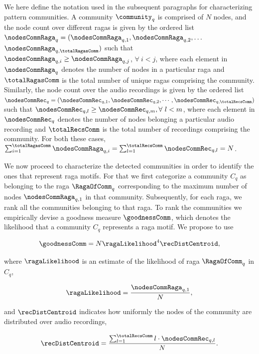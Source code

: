 {We here define the notation used in the subsequent paragraphs for characterizing pattern communities. A community $\community_q$ is comprised of $N$ nodes, and the node count over different \glspl{raga} is given by the ordered list ${{\nodesCommRaga}_q} = (\nodesCommRaga_{q,1}, \nodesCommRaga_{q,2},\dots$ $\nodesCommRaga_{q,\totalRagasComm})$ such that $\nodesCommRaga_{q,i} \geq \nodesCommRaga_{q,j}$, $\forall~ i < j$,
where each element in $\nodesCommRaga_{q}$ denotes the number of nodes in a particular \gls{raga} and $\totalRagasComm$ is the total number of unique \glspl{raga} comprising the community. Similarly, the node count over the audio recordings is given by the ordered list ${{\nodesCommRec}_q} = (\nodesCommRec_{q,1}, \nodesCommRec_{q,2},\cdots,\nodesCommRec_{q,\totalRecsComm})$ such that $\nodesCommRec_{q,l} \geq \nodesCommRec_{q,m}, \forall~l < m$, where each element in $\nodesCommRec_{q}$ denotes the number of nodes belonging a particular audio recording and $\totalRecsComm$ is the total number of recordings comprising the community. For both these cases, $\sum_{i=1}^{\totalRagasComm}\nodesCommRaga_{q,i} = \sum_{l=1}^{\totalRecsComm}\nodesCommRec_{q,l} = N$.

We now proceed to characterize the detected communities in order to identify the ones that represent \gls{raga} motifs. For that we first categorize a community $C_q$ as belonging to the \gls{raga} $\RagaOfComm_q$ corresponding to the maximum number of nodes $\nodesCommRaga_{q,1}$ in that community. Subsequently, for each \gls{raga}, we rank all the communities belonging to that \gls{raga}. To rank the communities we empirically devise a goodness measure $\goodnessComm$, which denotes the likelihood that a community $C_q$ represents a \gls{raga} motif. We propose to use

\begin{equation}
\goodnessComm = N \ragaLikelihood^4 \recDistCentroid,
\label{eq:gamma_pattern_characterization}
\end{equation}

where $\ragaLikelihood$ is an estimate of the likelihood of \gls{raga} $\RagaOfComm_q$ in $C_q$, 

\begin{equation}
\ragaLikelihood = \frac{\nodesCommRaga_{q,1}}{N},
\end{equation}

and $\recDistCentroid$ indicates how uniformly the nodes of the community are distributed over audio recordings,

\begin{equation}
\recDistCentroid = \frac{\sum_{l=1}^{\totalRecsComm}l \cdot \nodesCommRec_{q,l}}{N}.
\end{equation}

}
